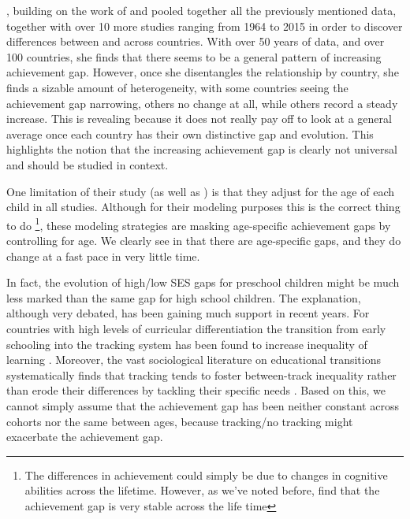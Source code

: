 \documentclass[11pt, a4paper]{article}\usepackage[]{graphicx}\usepackage[]{color}
\begin{document}
\citet{anna2016_global}, building on the work of \citet{anna2016} and \citet{reardon_portilla} pooled together all the previously mentioned data, together with over 10 more studies ranging from 1964 to 2015 in order to discover differences between and across countries. With over 50 years of data, and over 100 countries, she finds that there seems to be a general pattern of increasing achievement gap. However, once she disentangles the relationship by country, she finds a sizable amount of heterogeneity, with some countries seeing the achievement gap narrowing, others no change at all, while others record a steady increase. This is revealing because it does not really pay off to look at a general average once each country has their own distinctive gap and evolution. This highlights the notion that the increasing achievement gap is clearly not universal and should be studied in context. 

One limitation of their study (as well as \citet{reardon2011}) is that they adjust for the age of each child in all studies. Although for their modeling purposes this is the correct thing to do \footnote{The differences in achievement could simply be due to changes in cognitive abilities across the lifetime. However, as we've noted before, \citet{bradbury2015} find that the achievement gap is very stable across the life time}, these modeling strategies are masking age-specific achievement gaps by controlling for age. We clearly see in \citet{reardon_portilla} that there are age-specific gaps, and they do change at a fast pace in very little time.

In fact, the evolution of high/low SES gaps for preschool children might be much less marked than the same gap for high school children. The explanation, although very debated, has been gaining much support in recent years. For countries with high levels of curricular differentiation the transition from early schooling into the tracking system has been found to increase inequality of learning \citep{hanushek_woesmann_tracking}. Moreover, the vast sociological literature on educational transitions systematically finds that tracking tends to foster between-track inequality rather than erode their differences by tackling their specific needs \citep{werfhorst_mijs}. Based on this, we cannot simply assume that the achievement gap has been neither constant across cohorts nor the same between ages, because tracking/no tracking might exacerbate the achievement gap.

\end{document}
